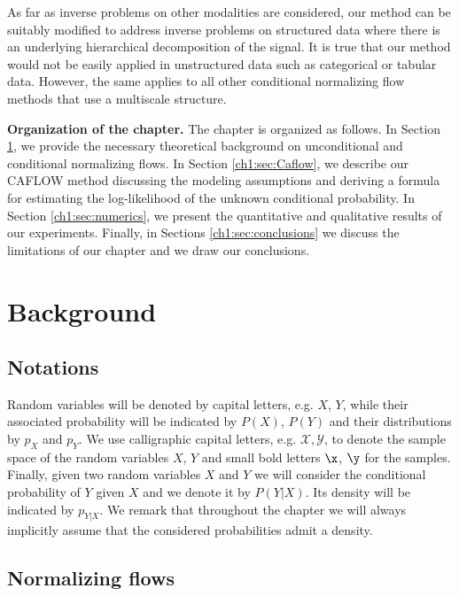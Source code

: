As far as inverse problems on other modalities are considered, our method can be suitably modified to address inverse problems on structured data where there is an underlying hierarchical decomposition of the signal. It is true that our method would not be easily applied in unstructured data such as categorical or tabular data. However, the same applies to all other conditional normalizing flow methods that use a multiscale structure.
\color{black}

\medskip

\textbf{Organization of the chapter.} The chapter is organized as follows.
In Section \ref{ch1:sec:background}, we provide the necessary theoretical background on unconditional and conditional normalizing flows. In Section \ref{ch1:sec:Caflow}, we describe our CAFLOW method discussing the modeling assumptions and deriving a formula for estimating the log-likelihood of the unknown conditional probability. In Section \ref{ch1:sec:numerics}, we present the quantitative and qualitative results of our experiments. Finally, in Sections \ref{ch1:sec:conclusions} we discuss the limitations of our chapter and we draw our conclusions. 

\section{Background}\label{ch1:sec:background}

\subsection{Notations}

Random variables will be denoted by capital letters, e.g. $X$, $Y$, while their associated probability will be indicated by $P(X)$, $P(Y)$ and their distributions by $p_X$ and $p_Y$. 
We use calligraphic capital letters, e.g. $\mathcal{X}, \mathcal{Y}$, to denote the sample space of the random variables $X$, $Y$ and small bold letters $\x$, $\y$ for the samples. Finally, given two random variables $X$ and $Y$ we will consider the conditional probability of $Y$ given $X$ and we denote it by $P(Y|X)$. Its density will be indicated by $p_{Y|X}$. We remark that throughout the chapter we will always implicitly assume that the considered probabilities admit a density.

\subsection{Normalizing flows}\label{ch1:subsec:normalizing}

